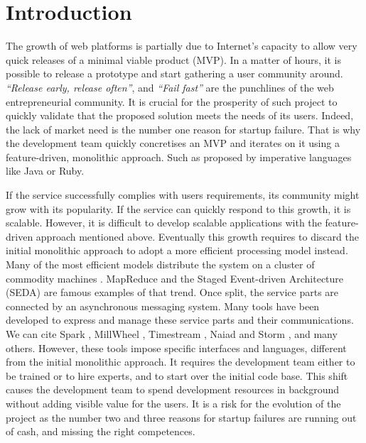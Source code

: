 \section{Introduction}

The growth of web platforms is partially due to Internet's capacity to allow very quick releases of a minimal viable product (MVP).
In a matter of hours, it is possible to release a prototype and start gathering a user community around.
\textit{``Release early, release often''}, and \textit{``Fail fast''} are the punchlines of the web entrepreneurial community.
It is crucial for the prosperity of such project to quickly validate that the proposed solution meets the needs of its users.
Indeed, the lack of market need is the number one reason for startup failure.
That is why the development team quickly concretises an MVP and iterates on it using a feature-driven, monolithic approach.
Such as proposed by imperative languages like Java or Ruby.

If the service successfully complies with users requirements, its community might grow with its popularity.
If the service can quickly respond to this growth, it is scalable.
However, it is difficult to develop scalable applications with the feature-driven approach mentioned above.
Eventually this growth requires to discard the initial monolithic approach to adopt a more efficient processing model instead.
Many of the most efficient models distribute the system on a cluster of commodity machines \cite{Fox1997}.
MapReduce \cite{Dean2008} and the Staged Event-driven Architecture (SEDA) \cite{Welsh2000} are famous examples of that trend. %
Once split, the service parts are connected by an asynchronous messaging system.
Many tools have been developed to express and manage these service parts and their communications.
We can cite Spark \cite{Zaharia2010}, MillWheel \cite{Akidau2013}, Timestream \cite{Qian2013}, Naiad \cite{McSherry} and Storm \cite{Toshniwal2014}, and many others.
However, these tools impose specific interfaces and languages, different from the initial monolithic approach.
It requires the development team either to be trained or to hire experts, and to start over the initial code base.
This shift causes the development team to spend development resources in background without adding visible value for the users.
It is a risk for the evolution of the project as the number two and three reasons for startup failures are running out of cash, and missing the right competences.

